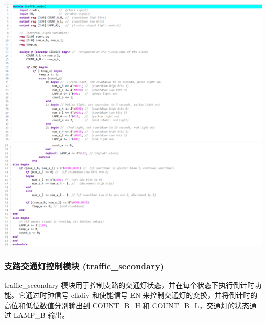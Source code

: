 \documentclass[a4,10pt,zihao=-4]{ctexart}
\begin{document}
\vspace{1em}
\noindent\includegraphics[width=1\textwidth]{traffic_main_1_code.png}
\noindent\includegraphics[width=1\textwidth]{traffic_main_2_code.png}


\newpage
\subsubsection{支路交通灯控制模块 (traffic\_secondary)}
traffic\_secondary 模块用于控制支路的交通灯状态，并在每个状态下执行倒计时功能。它通过时钟信号 clkdiv 和使能信号 EN 来控制交通灯的变换，并将倒计时的高位和低位数值分别输出到 COUNT\_B\_H 和 COUNT\_B\_L，交通灯的状态通过 LAMP\_B 输出。
\end{document}

